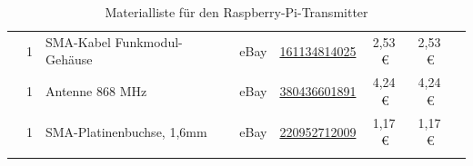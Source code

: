 \documentclass[paper=a4, parskip, numbers=noenddot, toc=listof, headsepline]{scrbook}
\begin{document}
{\begin{longtabu}{p{1.2cm}cXllSSp{2.35cm}}
					                  & 1    & SMA-Kabel Funkmodul-Gehäuse                           & eBay       & \href{http://www.ebay.com/itm/161134814025}{161134814025}                                                                                                   & 2,53\,€  & 2,53\,€  &                                          \\
					                  & 1    & Antenne 868 MHz                                       & eBay       & \href{http://www.ebay.de/itm/380436601891}{380436601891}                                                                                                    & 4,24\,€  & 4,24\,€  &                                          \\
					                  & 1    & SMA-Platinenbuchse, 1,6mm                             & eBay       & \href{http://www.ebay.com/itm/220952712009}{220952712009}                                                                                                   & 1,17\,€  & 1,17\,€  &                                          \\ \hline
					\caption{\normalsize Materialliste für den Raspberry-Pi-Transmitter}
					\label{tab:raspibom}
				\end{longtabu}
			}

			\newpage
\end{document}
